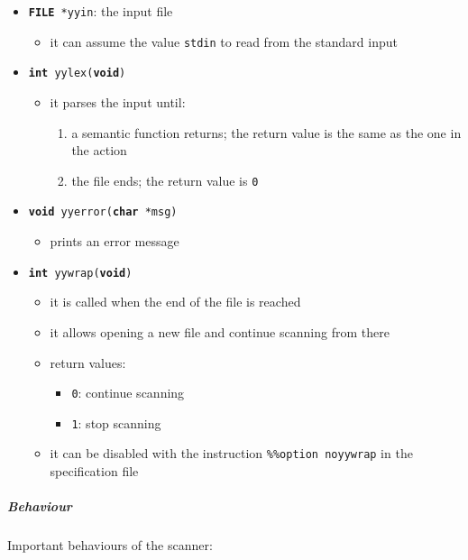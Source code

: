 \documentclass[english]{article}
\begin{document}
\begin{itemize}[label=\textbf{\texttt{>}}]
  \item \texttt{\textbf{FILE} *yyin}: the input file
        \begin{itemize}
          \item it can assume the value \texttt{stdin} to read from the standard input
        \end{itemize}
  \item \texttt{\textbf{int} yylex(\textbf{void})}
        \begin{itemize}
          \item it parses the input until:
                \begin{enumerate}
                  \item a semantic function returns; the return value is the same as the one in the action
                  \item the file ends; the return value is \texttt{0}
                \end{enumerate}
        \end{itemize}
  \item \texttt{\textbf{void} yyerror(\textbf{char} *msg)}
        \begin{itemize}
          \item prints an error message
        \end{itemize}
  \item \texttt{\textbf{int} yywrap(\textbf{void})}
        \begin{itemize}
          \item it is called when the end of the file is reached
          \item it allows opening a new file and continue scanning from there
          \item return values:
                \begin{itemize}
                  \item \texttt{0}: continue scanning
                  \item \texttt{1}: stop scanning
                \end{itemize}
          \item it can be disabled with the instruction \texttt{\%\%option noyywrap} in the specification file
        \end{itemize}
\end{itemize}

\subparagraph*{Behaviour}
Important behaviours of the scanner:
\end{document}
